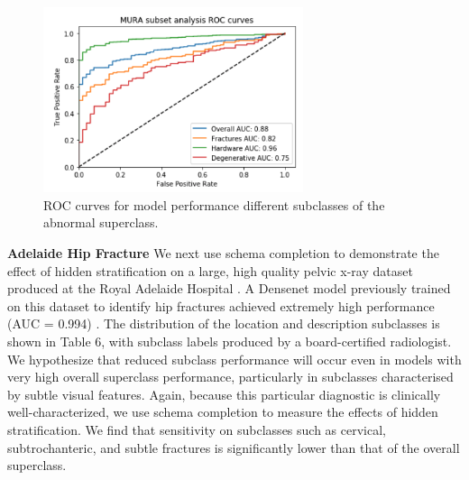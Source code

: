 \documentclass{article}
\begin{document}
 \begin{figure}[htb!]
 \centering
\includegraphics[width=3in]{MURA-ROC-temp.png}
\caption{ROC curves for model performance different subclasses of the abnormal superclass.}
\label{fig:mura}
\end{figure}

\textbf{Adelaide Hip Fracture} We next use schema completion to demonstrate the effect of hidden stratification on a large, high quality pelvic x-ray dataset produced at the Royal Adelaide Hospital \citep{Gale_W_Oakden-Rayner_L_Carneiro_G_Bradley_AP_Palmer_LJ2017-tl}.
 A Densenet model previously trained on this dataset to identify hip fractures achieved extremely high performance (AUC = 0.994) \citep{Gale_W_Oakden-Rayner_L_Carneiro_G_Bradley_AP_Palmer_LJ2017-tl}. 
 The distribution of the location and description subclasses is shown in Table 6, with subclass labels produced by a board-certified radiologist.  
 We hypothesize that reduced subclass performance will occur even in models with very high overall superclass performance, particularly in subclasses characterised by subtle visual features.  
 Again, because this particular diagnostic is clinically well-characterized, we use schema completion to measure the effects of hidden stratification.  
 We find that sensitivity on subclasses such as cervical, subtrochanteric, and subtle fractures is significantly lower than that of the overall superclass.  
 
\end{document}

